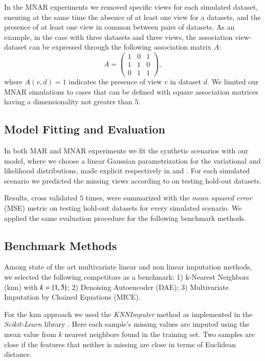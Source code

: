 In the MNAR experiments we removed specific views for each simulated dataset, ensuring at the same time the absence of at least one view for a datasets, and the presence of at least one view in common between pairs of datasets.
As an example, in the case with three datasets and three views, the association view-dataset can be expressed through the following association matrix $A$:
\begin{equation}
A = 
\begin{pmatrix}
1 & 0 & 1 \\
1 & 1 & 0 \\
0 & 1 & 1 
\end{pmatrix},
\end{equation}
where $A(v,d)=1$ indicates the presence of view $v$ in dataset $d$.
We limited our MNAR simulations to cases that can be defined with square association matrices having a dimensionality not greater than $5$.

\subsection{Model Fitting and Evaluation}
In both MAR and MNAR experiments we fit the synthetic scenarios with our model, where we choose a linear Gaussian parametrization for the variational and likelihood distributions, made explicit respectively in  and .
For each simulated scenario we predicted the missing views according to  on testing hold-out datasets.

Results, cross validated $5$ times, were summarized with the \textit{mean squared error} (MSE) metric on testing hold-out datasets for every simulated scenario.
We applied the same evaluation procedure for the following benchmark methods.

\subsection{Benchmark Methods}
Among state of the art multivariate linear and non linear imputation methods, we selected the following competitors as a benchmark:
1) k-Nearest Neighbors (knn) with $k=\left\{1, 5\right\}$;
2) Denoising Autoencoder (DAE);
3) Multivariate Imputation by Chained Equations (MICE).

For the knn approach we used the \textit{KNNImputer} method as implemented in the \textit{Scikit-Learn} library \citep{sklearn}.
Here each sample's missing values are imputed using the mean value from $k$ nearest neighbors found in the training set.
Two samples are close if the features that neither is missing are close in terms of Euclidean distance.

